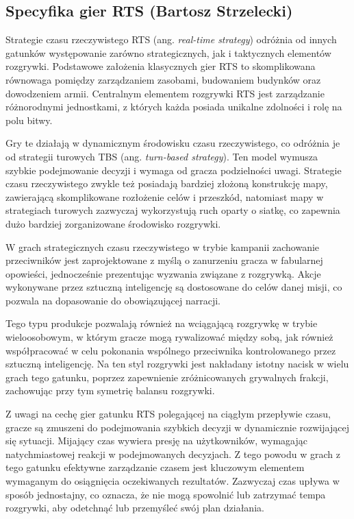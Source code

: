 \subsection{Specyfika gier RTS (Bartosz Strzelecki)}\label{ss:rts}
Strategie czasu rzeczywistego RTS (ang. \textit{real-time strategy}) odróżnia od innych gatunków występowanie zarówno strategicznych, jak i taktycznych
elementów rozgrywki. Podstawowe założenia klasycznych gier RTS to skomplikowana równowaga pomiędzy zarządzaniem zasobami, budowaniem budynków oraz
dowodzeniem armii. Centralnym elementem rozgrywki RTS jest zarządzanie różnorodnymi jednostkami, z których każda posiada unikalne zdolności i rolę na polu bitwy.

Gry te działają w dynamicznym środowisku czasu rzeczywistego, co odróżnia je od strategii turowych TBS (ang. \textit{turn-based strategy}). Ten model wymusza szybkie podejmowanie decyzji
i wymaga od gracza podzielności uwagi. Strategie czasu rzeczywistego zwykle też posiadają bardziej złożoną konstrukcję mapy, zawierającą skomplikowane
rozłożenie celów i przeszkód, natomiast mapy w strategiach turowych zazwyczaj wykorzystują ruch oparty o siatkę, co zapewnia dużo bardziej
zorganizowane środowisko rozgrywki.

W grach strategicznych czasu rzeczywistego w trybie kampanii zachowanie przeciwników jest zaprojektowane z myślą o zanurzeniu gracza w fabularnej opowieści, jednocześnie
prezentując wyzwania związane z rozgrywką. Akcje wykonywane przez sztuczną inteligencję są dostosowane do celów danej misji, co pozwala
na dopasowanie do obowiązującej narracji.

Tego typu produkcje pozwalają również na wciągającą rozgrywkę w trybie wieloosobowym, w którym gracze mogą rywalizować między sobą, jak również
współpracować w celu pokonania wspólnego przeciwnika kontrolowanego przez sztuczną inteligencję. Na ten styl rozgrywki jest nakładany istotny nacisk
w wielu grach tego gatunku, poprzez zapewnienie zróżnicowanych grywalnych frakcji, zachowując przy tym symetrię balansu rozgrywki.

Z uwagi na cechę gier gatunku RTS polegającej na ciągłym przepływie czasu, gracze są zmuszeni
do podejmowania szybkich decyzji w dynamicznie rozwijającej się sytuacji. Mijający czas
wywiera presję na użytkowników, wymagając natychmiastowej reakcji w podejmowanych decyzjach.
Z tego powodu w grach z tego gatunku efektywne zarządzanie czasem jest kluczowym elementem
wymaganym do osiągnięcia oczekiwanych rezultatów. Zazwyczaj czas upływa w sposób jednostajny, co oznacza, że
nie mogą spowolnić lub zatrzymać tempa rozgrywki, aby odetchnąć lub przemyśleć swój plan działania.

